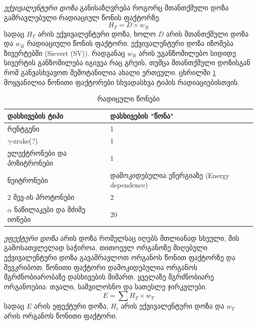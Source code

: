 \documentclass[12pt,a4paper,]{report}
\begin{document}
\textit{ექვივალენტური დოზა} განისაზღვრება როგორც შთანთქმული დოზა გამრავლებული რადიაციულ წონის ფაქტორზე.
	\begin{equation}
		H_T = D \times w_R
	\end{equation}
სადაც $H_T$ არის ექვივალენტური დოზა, ხოლო $D$ არის შთანთქმული დოზა და $w_R$ რადიაციული წონის ფაქტორი. ექვივალენტური დოზა იზომება ზივერტებში (Sievert (SV)). რადგანაც $w_R$ არის უგანზომილებო სიდიდე სივერტის განზომილება იგივეა რაც გრეის, თუმცა შთანთქმული დოზისგან რომ განვასხვავოთ შემოტანილია ახალი ერთეული. ცხრილში \ref{tab:rad_weight_factor} მოყვანილია წონითი ფაქტორები სხვადასხვა ტიპის რადიაციებისთვის. 
    \begin{table}[h]
        \centering
        \begin{tabular}{l | l}
             დასხივების ტიპი & დასხივების "წონა" \\
             \hline
             \hline
             რენტგენი & 1 \\
             $\gamma$-zrake(?) & 1 \\
             ელექტრონები და პოზიტრონები & 1 \\
             ნეიტრონები & დამოკიდებულია ენერგიაზე (Energy dependence) \\
             2 მევ-ის პროტონები & 2 \\
             $\alpha$ ნაწილაკები და მძიმე იონები & 20 \\
        \end{tabular}
        \caption{რადიცული წონები}
        \label{tab:rad_weight_factor}
    \end{table}
    
\textit{ეფექტური დოზა} არის დოზა რომელსაც იღებს მთლიანად სხეული, მის გამოსათვლელად საჭიროა, თითოეულ ორგანოზე მიღებული ექვივალენტური დოზა გავამრავლოთ ორგანოს წონით ფაქტორზე და შევკრიბოთ. წონითი ფაქტორი დამოკიდებულია ორგანოს მგრძნობიარობაზე დასხივების მიმართ. ყველაზე მგრძნობიარე ორგანოებია: თვალი, საშვილოსნო და სათესლე ჯირკვლები.
	\begin{equation}
		E = \sum H_T \times w_T
	\end{equation}
სადაც $E$ არის ეფექტური დოზა,  $H_t$ არის ექვივალენტური დოზა და $w_T$ არის ორგანოს წონითი ფაქტორი. 
\end{document}
